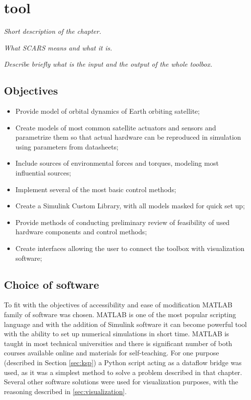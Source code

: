 \section{\acf{tool}}\label{sec:toolbox}
\textit{Short description of the chapter.}

\textit{What SCARS means and what it is.}

\textit{Describe briefly what is the input and the output of the whole toolbox.}


\subsection{Objectives}\label{toolbox:objectives}

    \begin{itemize}
        \item Provide model of orbital dynamics of Earth orbiting satellite;
        \item Create models of most common satellite actuators and sensors and parametrize them so that actual hardware can be reproduced in simulation using parameters from datasheets;
        \item Include sources of environmental forces and torques, modeling most influential sources;
        \item Implement several of the most basic control methods;
        \item Create a Simulink Custom Library, with all models masked for quick set up;
        \item Provide methods of conducting preliminary review of feasibility of used hardware components and control methods;
        \item Create interfaces allowing the user to connect the toolbox with visualization software;
    \end{itemize}

\subsection{Choice of software}
    To fit with the objectives of accessibility and ease of modification MATLAB family of software was chosen. MATLAB is one of the most popular scripting language and with the addition of Simulink software it can become powerful tool with the ability to set up numerical simulations in short time. MATLAB is taught in most technical universities and there is significant number of both courses available online and materials for self-teaching. For one purpose (described in Section \ref{sec:ksp}) a Python script acting as a dataflow bridge was used, as it was a simplest method to solve a problem described in that chapter. Several other software solutions were used for visualization purposes, with the reasoning described in \autoref{sec:visualization}.

